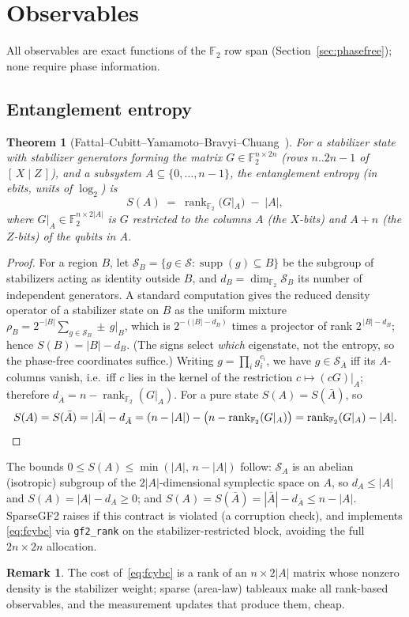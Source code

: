 \documentclass[11pt]{article}
\theoremstyle{definition}
\newtheorem{remark}[definition]{Remark}
\theoremstyle{plain}
\newtheorem{theorem}[definition]{Theorem}
\newcommand{\F}{\mathbb{F}}
\newcommand{\rank}{\operatorname{rank}}
\newcommand{\code}{\textsf{\small SparseGF2}}
\begin{document}
\section{Observables}
\label{sec:obs}

All observables are exact functions of the $\F_2$ row span
(Section~\ref{sec:phasefree}); none require phase information.

\subsection{Entanglement entropy}
\begin{theorem}[Fattal--Cubitt--Yamamoto--Bravyi--Chuang~\cite{FCYBC}]
\label{thm:fcybc}
For a stabilizer state with stabilizer generators forming the matrix
$G\in\F_2^{n\times 2n}$ (rows $n..2n{-}1$ of $[\,X\mid Z\,]$), and a subsystem
$A\subseteq\{0,\dots,n-1\}$, the entanglement entropy (in ebits, units of
$\log_2$) is
\begin{equation}
\label{eq:fcybc}
  S(A) \;=\; \rank_{\F_2}\!\bigl(G|_A\bigr) \;-\; |A| ,
\end{equation}
where $G|_A\in\F_2^{n\times 2|A|}$ is $G$ restricted to the columns
$A$ (the $X$-bits) and $A+n$ (the $Z$-bits) of the qubits in $A$.
\end{theorem}
\begin{proof}
For a region $B$, let $\mathcal{S}_B=\{g\in\mathcal{S}:\operatorname{supp}(g)
\subseteq B\}$ be the subgroup of stabilizers acting as identity outside $B$,
and $d_B=\dim_{\F_2}\mathcal{S}_B$ its number of independent generators. A
standard computation gives the reduced density operator of a stabilizer state on
$B$ as the uniform mixture
$\rho_B=2^{-|B|}\sum_{g\in\mathcal{S}_B}\!\pm\,g|_B$, which is
$2^{-(|B|-d_B)}$ times a projector of rank $2^{\,|B|-d_B}$; hence
$S(B)=|B|-d_B$. (The signs select \emph{which} eigenstate, not the entropy, so
the phase-free coordinates suffice.) Writing $g=\prod_i g_i^{c_i}$, we have
$g\in\mathcal{S}_{\bar A}$ iff its $A$-columns vanish, i.e.\ iff $c$ lies in the
kernel of the restriction $c\mapsto (cG)|_A$; therefore
$d_{\bar A}=n-\rank_{\F_2}(G|_A)$. For a pure state $S(A)=S(\bar A)$, so
\[
  S(A)=S(\bar A)=|\bar A|-d_{\bar A}
       =(n-|A|)-\bigl(n-\rank_{\F_2}(G|_A)\bigr)
       =\rank_{\F_2}(G|_A)-|A|. \qedhere
\]
\end{proof}
The bounds $0\le S(A)\le\min(|A|,\,n-|A|)$ follow: $\mathcal{S}_A$ is an abelian
(isotropic) subgroup of the $2|A|$-dimensional symplectic space on $A$, so
$d_A\le|A|$ and $S(A)=|A|-d_A\ge0$; and $S(A)=S(\bar A)=|\bar A|-d_{\bar A}\le n-|A|$.
\code{} raises if this contract is violated (a corruption check), and implements
\eqref{eq:fcybc} via \texttt{gf2\_rank} on the stabilizer-restricted block,
avoiding the full $2n\times2n$ allocation.
\begin{remark}
The cost of~\eqref{eq:fcybc} is a rank of an $n\times 2|A|$ matrix whose nonzero
density is the stabilizer weight; sparse (area-law) tableaux make all
rank-based observables, and the measurement updates that produce them, cheap.
\end{remark}
\end{document}
